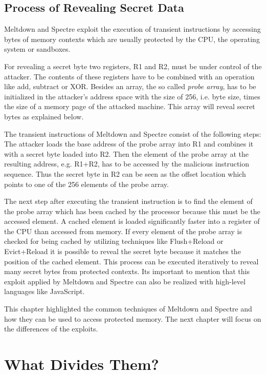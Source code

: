 \documentclass[a4paper,oneside,openright] {scrreprt}
\begin{document}
\subsection{Process of Revealing Secret Data}
\label{ch:intro:motivation:A}

Meltdown and Spectre exploit the execution of transient instructions by accessing bytes of memory contexts 
 which are usually protected by the CPU, the operating system or sandboxes. 

For revealing a secret byte two registers, R1 and R2, must be under control of the attacker. The contents of these registers have to be 
combined with an operation like add, subtract or XOR. Besides an array, the so called \textit{probe array}, has to be 
initialized in the attacker's address space with the size of 256, i.e. byte size, times the size of a memory page of the attacked machine.
This array will reveal secret bytes as explained below.

The transient instructions of Meltdown and Spectre consist of the following steps:
The attacker loads the base address of the probe array into R1 and combines it with a secret byte loaded into R2. 
Then the element of the probe array at the resulting address, e.g. R1+R2, has to be accessed by the malicious instruction sequence.
Thus the secret byte in R2 can be seen as the offset location which points to one of the 256 elements of the probe array.

The next step after executing the transient instruction is to find the element of the probe array which has been cached by the processor
because this must be the accessed element.
A cached element is loaded significantly faster into a register of the CPU than accessed from memory.
If every element of the probe array is checked for being cached by utilizing techniques like Flush+Reload or Evict+Reload it is possible
to reveal the secret byte because it matches the position of the cached element.
This process can be executed iteratively to reveal many secret bytes from protected contexts. Its important to mention that this exploit
applied by Meltdown and Spectre can also be realized with high-level languages like JavaScript.

This chapter highlighted the common techniques of Meltdown and Spectre and how they can be used to access protected memory.
The next chapter will focus on the differences of the exploits.

\section{What Divides Them?}
\label{ch:whatDividesThem}
\end{document}
